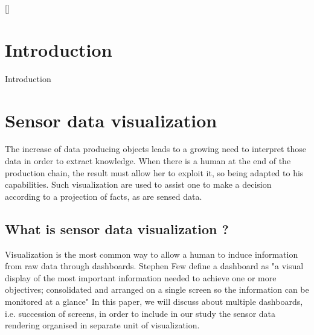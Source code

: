 \documentclass{acm_proc_article-sp}
\begin{document}
[]


\section{Introduction}
Introduction

\section{Sensor data visualization}
The increase of data producing objects leads to a growing need to interpret those
data in order to extract knowledge. When there is a human at the end of the
production chain, the result must allow her to exploit it, so being adapted to his
capabilities. Such visualization are used to assist one to make a decision according
to a projection of facts, as are sensed data.

\subsection{What is sensor data visualization ?}
Visualization is the most common way to allow a human to induce information from raw data
through dashboards.
Stephen Few define a dashboard as "a visual display of the most important
information needed to achieve one or more objectives; consolidated and arranged
on a single screen so the information can be monitored at a glance"\cite{few:dashboard}
In this paper, we will discuss about multiple dashboards, i.e. succession of screens,
in order to include in our study the sensor data rendering organised in separate unit
of visualization.
\end{document}
